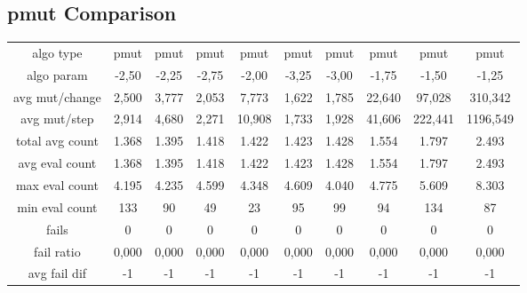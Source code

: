 \subsection{pmut Comparison}

\begin{tabular}[h]{cccccccccc}
algo type&             pmut&      pmut&      pmut&      pmut&      pmut&      pmut&      pmut&      pmut&      pmut\\
algo param&           -2,50&     -2,25&     -2,75&     -2,00&     -3,25&     -3,00&     -1,75&     -1,50&     -1,25\\
avg mut/change&       2,500&     3,777&     2,053&     7,773&     1,622&     1,785&    22,640&    97,028&   310,342\\
avg mut/step&         2,914&     4,680&     2,271&    10,908&     1,733&     1,928&    41,606&   222,441&  1196,549\\
\hline
total avg count&      1.368&     1.395&     1.418&     1.422&     1.423&     1.428&     1.554&     1.797&     2.493\\
avg eval count&       1.368&     1.395&     1.418&     1.422&     1.423&     1.428&     1.554&     1.797&     2.493\\
max eval count&       4.195&     4.235&     4.599&     4.348&     4.609&     4.040&     4.775&     5.609&     8.303\\
min eval count&         133&        90&        49&        23&        95&        99&        94&       134&        87\\
\hline
fails&                    0&         0&         0&         0&         0&         0&         0&         0&         0\\
fail ratio&           0,000&     0,000&     0,000&     0,000&     0,000&     0,000&     0,000&     0,000&     0,000\\
avg fail dif&            -1&        -1&        -1&        -1&        -1&        -1&        -1&        -1&        -1\\
\end{tabular}


